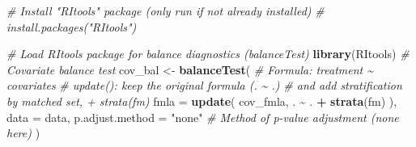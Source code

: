 \documentclass[
  12pt,
  leqno]{article}
\newenvironment{Shaded}{\begin{snugshade}}{\end{snugshade}}
\newcommand{\AttributeTok}[1]{\textcolor[rgb]{0.13,0.29,0.53}{#1}}
\newcommand{\CommentTok}[1]{\textcolor[rgb]{0.56,0.35,0.01}{\textit{#1}}}
\newcommand{\FunctionTok}[1]{\textcolor[rgb]{0.13,0.29,0.53}{\textbf{#1}}}
\newcommand{\NormalTok}[1]{#1}
\newcommand{\OtherTok}[1]{\textcolor[rgb]{0.56,0.35,0.01}{#1}}
\newcommand{\SpecialCharTok}[1]{\textcolor[rgb]{0.81,0.36,0.00}{\textbf{#1}}}
\newcommand{\StringTok}[1]{\textcolor[rgb]{0.31,0.60,0.02}{#1}}
\begin{document}
\singlespacing

\begin{Shaded}
\begin{Highlighting}[]
\CommentTok{\# Install "RItools" package (only run if not already installed)}
\CommentTok{\# install.packages("RItools")}

\CommentTok{\# Load RItools package for balance diagnostics (balanceTest)}
\FunctionTok{library}\NormalTok{(RItools)}
\CommentTok{\# Covariate balance test}
\NormalTok{cov\_bal }\OtherTok{\textless{}{-}} \FunctionTok{balanceTest}\NormalTok{(}
  \CommentTok{\# Formula: treatment \textasciitilde{} covariates}
  \CommentTok{\# update(): keep the original formula (. \textasciitilde{} .)}
  \CommentTok{\# and add stratification by matched set, + strata(fm)}
  \AttributeTok{fmla =} \FunctionTok{update}\NormalTok{(}
\NormalTok{    cov\_fmla, . }\SpecialCharTok{\textasciitilde{}}\NormalTok{ . }\SpecialCharTok{+} \FunctionTok{strata}\NormalTok{(fm)}
\NormalTok{  ),}
  \AttributeTok{data =}\NormalTok{ data,}
  \AttributeTok{p.adjust.method =} \StringTok{"none"} \CommentTok{\# Method of p{-}value adjustment (none here)}
\NormalTok{)}
\end{Highlighting}
\end{Shaded}

\doublespacing
\end{document}
